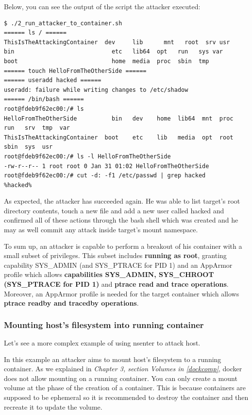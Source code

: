 Below, you can see the output of the script the attacker executed:

\begin{lstlisting}[style=terminal]
$ ./2_run_attacker_to_container.sh 
====== ls / ======
ThisIsTheAttackingContainer  dev     lib	  mnt   root  srv usr
bin                            etc   lib64  opt   run   sys var
boot                           home  media  proc  sbin  tmp
====== touch HelloFromTheOtherSide ======
====== useradd hacked ======
useradd: failure while writing changes to /etc/shadow
====== /bin/bash ======
root@fdeb9f62ec00:/# ls
HelloFromTheOtherSide          bin   dev	home  lib64  mnt  proc	run   srv  tmp	var
ThisIsTheAttackingContainer  boot    etc	lib   media  opt  root	sbin  sys  usr
root@fdeb9f62ec00:/# ls -l HelloFromTheOtherSide 
-rw-r--r-- 1 root root 0 Jan 31 01:02 HelloFromTheOtherSide
root@fdeb9f62ec00:/# cut -d: -f1 /etc/passwd | grep hacked
%hacked%
\end{lstlisting}

As expected, the attacker has succeeded again. He was able to list target's root directory contents, touch a new file and add a new user called hacked and confirmed all of these actions through the bash shell which was created and he may as well commit any attack inside target's mount namespace.
\begin{mdframed}[backgroundcolor=navajowhite]
To sum up, an attacker is capable to perform a breakout of his container with a small subset of privileges. This subset includes \textbf{running as root}, granting capability SYS\_ADMIN (and SYS\_PTRACE for PID 1) and an AppArmor profile which allows \textbf{capabilities SYS\_ADMIN, SYS\_CHROOT (SYS\_PTRACE for PID 1)} and \textbf{ptrace read and trace operations}. 
Moreover, an AppArmor profile is needed for the target container which allows \textbf{ptrace readby and tracedby operations}.
\end{mdframed}

\subsubsection{Mounting host's filesystem into running container}
Let's see a more complex example of using nsenter to attack host. 

In this example an attacker aims to mount host's filesystem to a running container. As we explained in \textit{Chapter 3, section Volumes in \ref{dockcomp}}, docker does not allow mounting on a running container. You can only create a mount volume at the phase of the creation of a container. This is because containers are supposed to be ephemeral so it is recommended to destroy the container and then recreate it to update the volume. 

